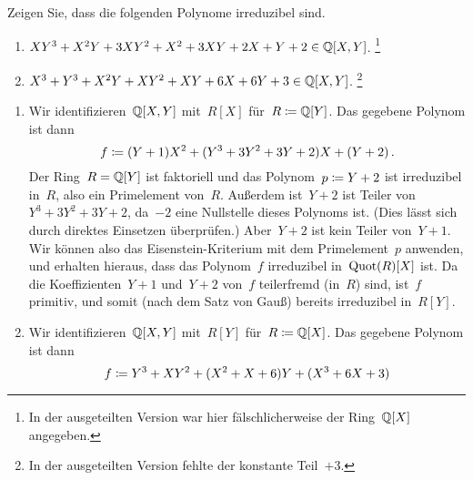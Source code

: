 \documentclass{scrartcl}
\begin{document}
\begin{exercise}
  Zeigen Sie, dass die folgenden Polynome irreduzibel sind.
  \begin{enumerate}
    \item
      $X Y^3 + X^2 Y + 3 X Y^2 + X^2 + 3 X Y + 2 X + Y + 2 \in \mathbb{Q}[X, Y]$.
      \footnote{
        In der ausgeteilten Version war hier fälschlicherweise der Ring~$\mathbb{Q}[X]$ angegeben.
      }
    \item
      $X^3 + Y^3 + X^2 Y + X Y^2 + XY + 6X + 6Y + 3 \in \mathbb{Q}[X,Y]$.
      \footnote{
        In der ausgeteilten Version fehlte der konstante Teil~$+3$.
      }
  \end{enumerate}
\end{exercise}

\begin{solution}
  \begin{enumerate}
    \item
      Wir identifizieren~$\mathbb{Q}[X, Y]$ mit~$R[X]$ für~$R \coloneqq \mathbb{Q}[Y]$.
      Das gegebene Polynom ist dann
      \[
        f
        \coloneqq
        (Y + 1) X^2
        +
        (Y^3 + 3 Y^2 + 3 Y + 2) X
        +
        (Y + 2) \,.
      \]
      Der Ring~$R = \mathbb{Q}[Y]$ ist faktoriell und das Polynom~$p \coloneqq Y + 2$ ist irreduzibel in~$R$, also ein Primelement von~$R$.
      Außerdem ist~$Y + 2$ ist Teiler von~$Y^3 + 3 Y^2 + 3 Y + 2$, da~$-2$ eine Nullstelle dieses Polynoms ist.
      (Dies lässt sich durch direktes Einsetzen überprüfen.)
      Aber~$Y + 2$ ist kein Teiler von~$Y + 1$.
      Wir können also das Eisenstein-Kriterium mit dem Primelement~$p$ anwenden, und erhalten hieraus, dass das Polynom~$f$ irreduzibel in~$\operatorname{Quot}(R)[X]$ ist.
      Da die Koeffizienten~$Y + 1$ und~$Y + 2$ von~$f$ teilerfremd (in~$R$) sind, ist~$f$ primitiv, und somit (nach dem Satz von Gauß) bereits irreduzibel in~$R[Y]$.
    \item
      Wir identifizieren~$\mathbb{Q}[X, Y]$ mit~$R[Y]$ für~$R \coloneqq \mathbb{Q}[X]$.
      Das gegebene Polynom ist dann
      \[
        f
        \coloneqq
        Y^3
        +
        X Y^2
        +
        ( X^2 + X + 6 ) Y
        +
        ( X^3 + 6X + 3 )
      \]


\end{enumerate}
\end{solution}
\end{document}
